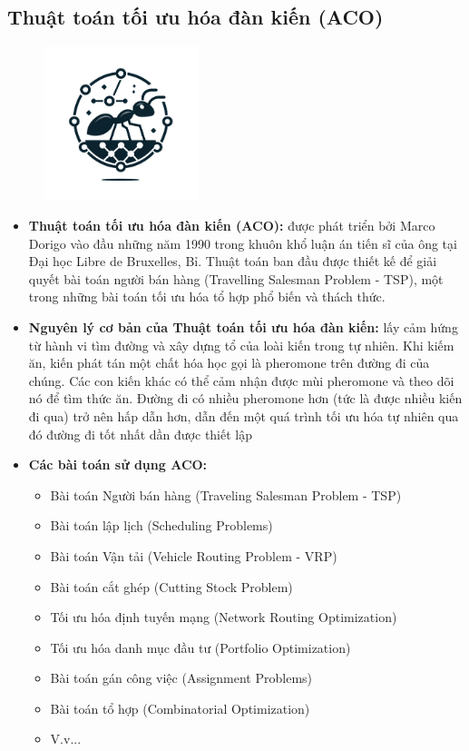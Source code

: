 \documentclass[14pt]{article}
\begin{document}
	\subsection{Thuật toán tối ưu hóa đàn kiến (ACO)}
	\begin{figure}[htbp]
		\centering
		\includegraphics[width=0.4\textwidth]{./Image/IconACO.png}
		\label{fig:mylabel}
	\end{figure}
	\begin{itemize}
		\item \textbf{Thuật toán tối ưu hóa đàn kiến (ACO):} được phát triển bởi Marco Dorigo vào đầu những năm 1990 trong khuôn khổ luận án tiến sĩ của ông tại Đại học Libre de Bruxelles, Bỉ. Thuật toán ban đầu được thiết kế để giải quyết bài toán người bán hàng (Travelling Salesman Problem - TSP), một trong những bài toán tối ưu hóa tổ hợp phổ biến và thách thức.
		\item \textbf{Nguyên lý cơ bản của Thuật toán tối ưu hóa đàn kiến:} lấy cảm hứng từ hành vi tìm đường và xây dựng tổ của loài kiến trong tự nhiên. Khi kiếm ăn, kiến phát tán một chất hóa học gọi là pheromone trên đường đi của chúng. Các con kiến khác có thể cảm nhận được mùi pheromone và theo dõi nó để tìm thức ăn. Đường đi có nhiều pheromone hơn (tức là được nhiều kiến đi qua) trở nên hấp dẫn hơn, dẫn đến một quá trình tối ưu hóa tự nhiên qua đó đường đi tốt nhất dần được thiết lập
		\item \textbf{Các bài toán sử dụng ACO:} 
		\begin{itemize}
			\item Bài toán Người bán hàng (Traveling Salesman Problem - TSP)
			\item Bài toán lập lịch (Scheduling Problems)
			\item Bài toán Vận tải (Vehicle Routing Problem - VRP)
			\item Bài toán cắt ghép (Cutting Stock Problem)
			\item Tối ưu hóa định tuyến mạng (Network Routing Optimization)
			\item Tối ưu hóa danh mục đầu tư (Portfolio Optimization)
			\item Bài toán gán công việc (Assignment Problems)
			\item Bài toán tổ hợp (Combinatorial Optimization)
			\item V.v...
		\end{itemize}
	\end{itemize}
\end{document}
